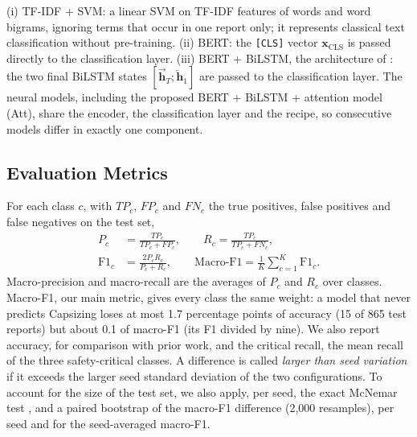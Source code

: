 \documentclass[conference]{IEEEtran}
\begin{document}
(i) TF-IDF + SVM: a linear SVM \cite{cortes1995support} on TF-IDF features \cite{salton1988term} of words and word bigrams, ignoring terms that occur in one report only; it represents classical text classification without pre-training. (ii) BERT: the \texttt{[CLS]} vector $\mathbf{x}_{\mathrm{CLS}}$ is passed directly to the classification layer. (iii) BERT + BiLSTM, the architecture of \cite{zhao2025causation}: the two final BiLSTM states $[\overrightarrow{\mathbf{h}}_T ; \overleftarrow{\mathbf{h}}_1]$ are passed to the classification layer. The neural models, including the proposed BERT + BiLSTM + attention model (Att), share the encoder, the classification layer and the recipe, so consecutive models differ in exactly one component.

\subsection{Evaluation Metrics}

For each class $c$, with $TP_c$, $FP_c$ and $FN_c$ the true positives, false positives and false negatives on the test set,
\begin{equation}
\begin{aligned}
  P_c &= \frac{TP_c}{TP_c + FP_c}, \qquad R_c = \frac{TP_c}{TP_c + FN_c}, \\
  \mathrm{F1}_c &= \frac{2 P_c R_c}{P_c + R_c}, \qquad \mathrm{Macro\text{-}F1} = \frac{1}{K}\sum_{c=1}^{K} \mathrm{F1}_c .
\end{aligned}
\end{equation}
Macro-precision and macro-recall are the averages of $P_c$ and $R_c$ over classes. Macro-F1, our main metric, gives every class the same weight: a model that never predicts Capsizing loses at most 1.7 percentage points of accuracy (15 of 865 test reports) but about 0.1 of macro-F1 (its F1 divided by nine). We also report accuracy, for comparison with prior work, and the critical recall, the mean recall of the three safety-critical classes. A difference is called \emph{larger than seed variation} if it exceeds the larger seed standard deviation of the two configurations. To account for the size of the test set, we also apply, per seed, the exact McNemar test \cite{dietterich1998approximate}, and a paired bootstrap of the macro-F1 difference (2,000 resamples), per seed and for the seed-averaged macro-F1.

\end{document}

